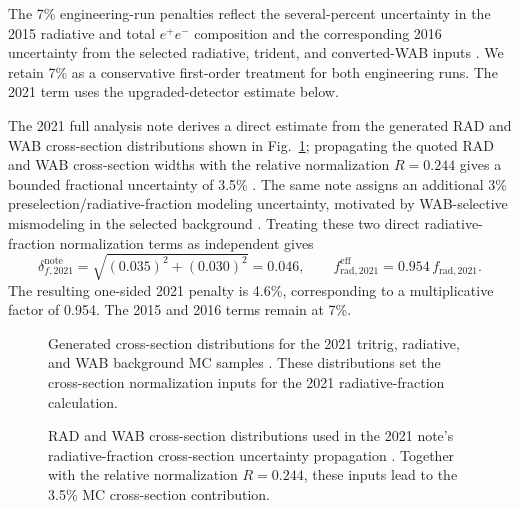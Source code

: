 The 7\% engineering-run penalties reflect the several-percent uncertainty in the 2015
radiative and total $e^+e^-$ composition and the corresponding 2016 uncertainty from
the selected radiative, trident, and converted-WAB inputs
\cite{HPS2015InternalNote,HPS2016PromptLong}. We retain 7\% as a conservative
first-order treatment for both engineering runs. The 2021 term uses the
upgraded-detector estimate below.

The 2021 full analysis note derives a direct estimate from the generated RAD and WAB
cross-section distributions shown in
Fig.~\ref{fig:2021-radfrac-xsec-note}; propagating the quoted RAD and WAB
cross-section widths with the relative normalization $R=0.244$ gives a bounded
fractional uncertainty of 3.5\% \cite[Sec.~9.1, Fig.~161]{HPS2021FullAnalysisNote}.
The same note assigns an additional 3\% preselection/radiative-fraction modeling
uncertainty, motivated by WAB-selective mismodeling in the selected background
\cite[Sec.~9.2]{HPS2021FullAnalysisNote}. Treating these two direct
radiative-fraction normalization terms as independent gives
\begin{equation}
\delta_{f,2021}^{\mathrm{note}}
= \sqrt{(0.035)^2 + (0.030)^2}
= 0.046,
\qquad
f_{\mathrm{rad},2021}^{\mathrm{eff}}
= 0.954\,f_{\mathrm{rad},2021}.
\label{eq:frad-2021-note-penalty}
\end{equation}
The resulting one-sided 2021 penalty is 4.6\%, corresponding to a multiplicative
factor of 0.954. The 2015 and 2016 terms remain at 7\%.

\begin{figure}[H]
\centering
{}
\caption{Generated cross-section distributions for the 2021 tritrig, radiative, and
WAB background MC samples \cite{HPS2021FullAnalysisNote}. These distributions set the
cross-section normalization inputs for the 2021 radiative-fraction calculation.}
\label{fig:2021-radfrac-xsec-note}
\end{figure}

\begin{figure}[H]
\centering
{}
\caption{RAD and WAB cross-section distributions used in the 2021 note's
radiative-fraction cross-section uncertainty propagation \cite{HPS2021FullAnalysisNote}.
Together with the relative normalization $R=0.244$, these inputs lead to the 3.5\%
MC cross-section contribution.}
\label{fig:2021-radfrac-xsec-syst-note}
\end{figure}

